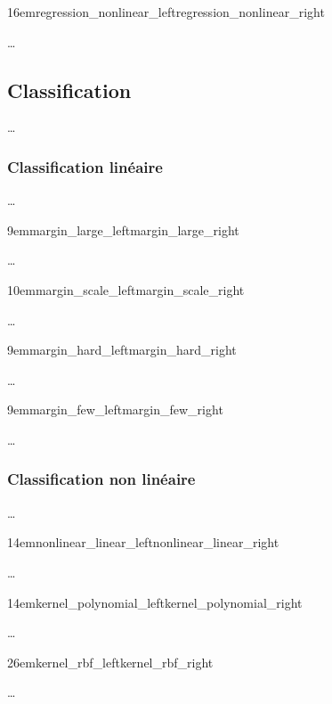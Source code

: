 {16em}{regression_nonlinear_left}{regression_nonlinear_right}

…

\subsection{Classification}

…

\subsubsection{Classification linéaire}

…

{9em}{margin_large_left}{margin_large_right}

…

\bifig{}{}
{10em}{margin_scale_left}{margin_scale_right}

…

\bifig{}{}
{9em}{margin_hard_left}{margin_hard_right}

…

\bifig{}{}
{9em}{margin_few_left}{margin_few_right}

…

\subsubsection{Classification non linéaire}

…

{14em}{nonlinear_linear_left}{nonlinear_linear_right}

…

{14em}{kernel_polynomial_left}{kernel_polynomial_right}

…

{26em}{kernel_rbf_left}{kernel_rbf_right}

…

\cite{svm}

\pagebreak
